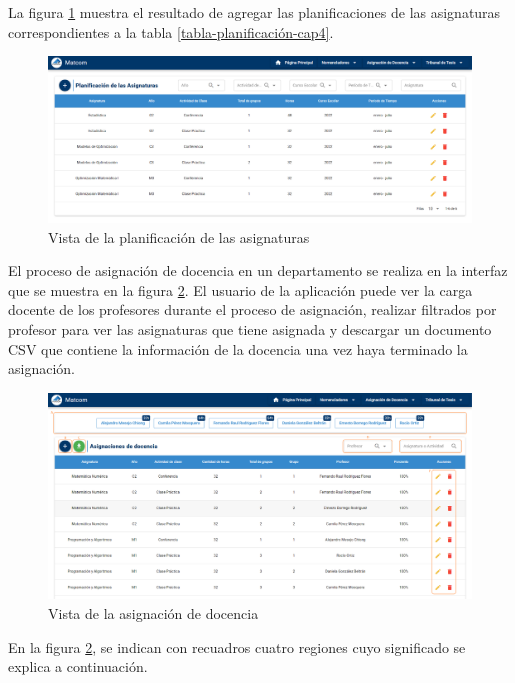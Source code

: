 La figura \ref{img-pd-result} muestra el resultado de agregar las planificaciones de las asignaturas 
correspondientes a la tabla \ref{tabla-planificación-cap4}. 


\begin{figure}[H]
    \includegraphics[scale=0.3]{Graphics/Implementation/Docencia/PD-result.png}
    \caption{Vista de la planificación de las asignaturas}
    \label{img-pd-result}
\end{figure}

El proceso de asignación de docencia en un departamento se realiza en la 
interfaz que se muestra en la figura \ref{img-ta-done}. El usuario de la 
aplicación puede ver la carga docente de los profesores durante el proceso 
de asignación, realizar filtrados por profesor para ver las asignaturas 
que tiene asignada y descargar un documento CSV que contiene la información 
de la docencia una vez haya terminado la asignación.


\begin{figure}[H]
    \includegraphics[scale=0.3]{Graphics/Implementation/Docencia/AD-asignada.png}
    \caption{Vista de la asignación de docencia}
    \label{img-ta-done}
\end{figure}

En la figura \ref{img-ta-done},
se indican con recuadros cuatro regiones cuyo significado se explica a continuación.

